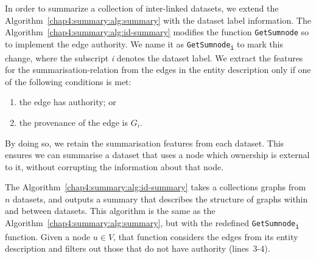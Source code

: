 In order to summarize a collection of inter-linked datasets, we extend the Algorithm~\ref{chap4:summary:alg:summary} with the dataset label information.
The Algorithm~\ref{chap4:summary:alg:id-summary} modifies the function \texttt{GetSumnode} so to implement the edge authority.
We name it as \texttt{GetSumnode\textsubscript{i}} to mark this change, where the subscript \emph{i} denotes the dataset label.
We extract the features for the \gls{summarisation-relation} from the edges in the entity description  only if one of the following conditions is met:
\begin{enumerate}
\item the edge has authority; or
\item the provenance of the edge is $G_i$.
\end{enumerate}
By doing so, we retain the summarisation features from each dataset. This ensures we can summarise a dataset that uses a node which ownership is external to it, without corrupting the information about that node.%

The Algorithm~\ref{chap4:summary:alg:id-summary} takes a collections graphs from $n$ datasets, and outputs a summary that describes the structure of graphs within and between datasets. This algorithm is the same as the Algorithm~\ref{chap4:summary:alg:summary}, but with the redefined \texttt{GetSumnode\textsubscript{i}} function. Given a node $u \in V$, that function considers the edges from its entity description and filters out those that do not have authority (lines~3-4).

